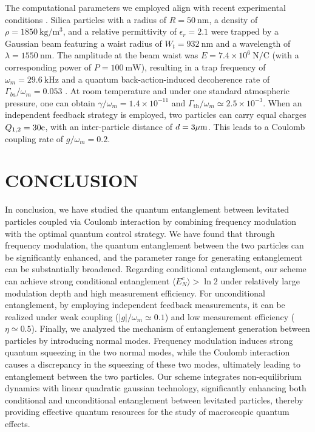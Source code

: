 \documentclass[
aps,
reprint,
superscriptaddress,
amsmath,amssymb,
pra
]{revtex4-2}
\begin{document}
The computational parameters we employed align with recent experimental conditions \cite{magrini2021real, tebbenjohanns2021quantum, delic2020cooling}. Silica particles with a radius of $R=50~\text{nm}$, a density of $\rho=1850~\text{kg}/\text{m}^3$, and a relative permittivity of $\epsilon_r=2.1$ were trapped by a Gaussian beam featuring a waist radius of $W_t=932~ \text{nm}$ and a wavelength of $\lambda=1550~\text{nm}$. The amplitude at the beam waist was $E=7.4\times 10^{6}~\text{N/C}$ (with a corresponding power of $P=100~\text{mW}$), resulting in a trap frequency of $\omega_m=29.6~\text{kHz}$ and a quantum back-action-induced decoherence rate of $\Gamma_{ba}/\omega_m = 0.053$ \cite{PhysRevA.100.013805}. At room temperature and under one standard atmospheric pressure, one can obtain $\gamma/\omega_m=1.4\times 10^{-11}$ and $\Gamma_\text{th}/\omega_m\simeq2.5\times 10^{-3}$. When an independent feedback strategy is employed, two particles can carry equal charges $Q_{1,2}=30 \text e$, with an inter-particle distance of $d=3\mu \text m$. This leads to a Coulomb coupling rate of $g/\omega_m=0.2$.
\section{CONCLUSION}
In conclusion, we have studied the quantum entanglement between levitated particles coupled via Coulomb interaction by combining frequency modulation with the optimal quantum control strategy. We have found that through frequency modulation, the quantum entanglement between the two particles can be significantly enhanced, and the parameter range for generating entanglement can be substantially broadened. Regarding conditional entanglement, our scheme can achieve strong conditional entanglement $\langle E_N^c \rangle > \ln 2$ under relatively large modulation depth and high measurement efficiency. For unconditional entanglement, by employing independent feedback measurements, it can be realized under weak coupling ($|g|/\omega_m \simeq 0.1$) and low measurement efficiency ($\eta \simeq 0.5$). Finally, we analyzed the mechanism of entanglement generation between particles by introducing normal modes. Frequency modulation induces strong quantum squeezing in the two normal modes, while the Coulomb interaction causes a discrepancy in the squeezing of these two modes, ultimately leading to entanglement between the two particles. Our scheme integrates non-equilibrium dynamics with linear quadratic gaussian technology, significantly enhancing both conditional and unconditional entanglement between levitated particles, thereby providing effective quantum resources for the study of macroscopic quantum effects. 
\end{document}
